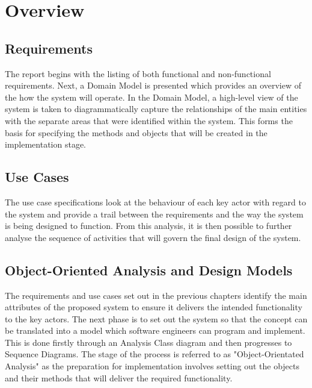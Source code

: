 \section{Overview}

\subsection{Requirements}
The report begins with the listing of both functional and non-functional requirements. Next, a Domain Model is presented which provides an overview of the how the system will operate. In the Domain Model, a high-level view of the system is taken to diagrammatically capture the relationships of the main entities with the separate areas that were identified within the system. This forms the basis for specifying the methods and objects that will be created in the implementation stage.

\subsection{Use Cases}
The use case specifications look at the behaviour of each key actor with regard to the system and provide a trail between the requirements and the way the system is being designed to function. From this analysis, it is then possible to further analyse the sequence of activities that will govern the final design of the system. 

\subsection{Object-Oriented Analysis and Design Models}
The requirements and use cases set out in the previous chapters identify the main attributes of the proposed system to ensure it delivers the intended functionality to the key actors. The next phase is to set out the system so that the concept can be translated into a model which software engineers can program and implement. This is done firstly through an Analysis Class diagram and then progresses to Sequence Diagrams. The stage of the process is referred to as "Object-Orientated Analysis" as the preparation for implementation involves setting out the objects and their methods that will deliver the required functionality.

